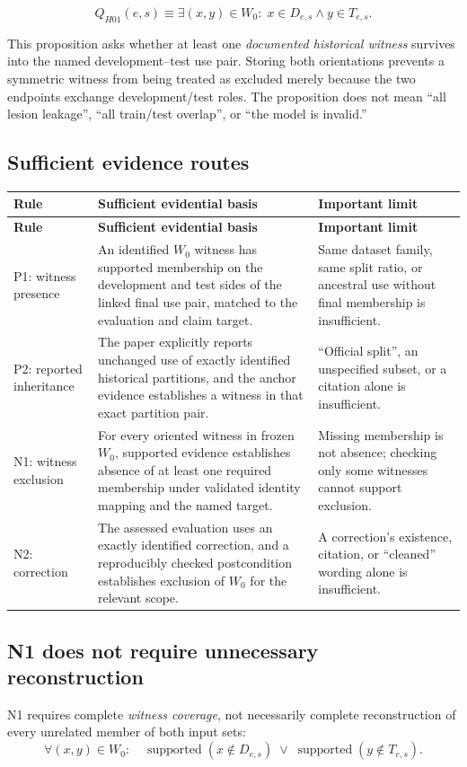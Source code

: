 \documentclass[11pt,a4paper]{article}
\begin{document}
\[
Q_{H01}(e,s)\equiv \exists(x,y)\in W_0:\; x\in D_{e,s}\land y\in T_{e,s}.
\]

This proposition asks whether at least one \emph{documented historical witness} survives into the named development--test use pair. Storing both orientations prevents a symmetric witness from being treated as excluded merely because the two endpoints exchange development/test roles. The proposition does not mean ``all lesion leakage'', ``all train/test overlap'', or ``the model is invalid.''

\subsection{Sufficient evidence routes}
\begin{longtable}{@{}L{20mm}L{69mm}L{62mm}@{}}
\toprule
\textbf{Rule} & \textbf{Sufficient evidential basis} & \textbf{Important limit}\\ \midrule
\endfirsthead
\toprule\textbf{Rule} & \textbf{Sufficient evidential basis} & \textbf{Important limit}\\ \midrule\endhead
P1: witness presence & An identified $W_0$ witness has supported membership on the development and test sides of the linked final use pair, matched to the evaluation and claim target. & Same dataset family, same split ratio, or ancestral use without final membership is insufficient.\\
P2: reported inheritance & The paper explicitly reports unchanged use of exactly identified historical partitions, and the anchor evidence establishes a witness in that exact partition pair. & ``Official split'', an unspecified subset, or a citation alone is insufficient.\\
N1: witness exclusion & For every oriented witness in frozen $W_0$, supported evidence establishes absence of at least one required membership under validated identity mapping and the named target. & Missing membership is not absence; checking only some witnesses cannot support exclusion.\\
N2: correction & The assessed evaluation uses an exactly identified correction, and a reproducibly checked postcondition establishes exclusion of $W_0$ for the relevant scope. & A correction's existence, citation, or ``cleaned'' wording alone is insufficient.\\
\bottomrule
\end{longtable}

\subsection{N1 does not require unnecessary reconstruction}
N1 requires complete \emph{witness coverage}, not necessarily complete reconstruction of every unrelated member of both input sets:
\[
\forall(x,y)\in W_0:\quad \operatorname{supported}(x\notin D_{e,s})\;\lor\;\operatorname{supported}(y\notin T_{e,s}).
\]
\end{document}
